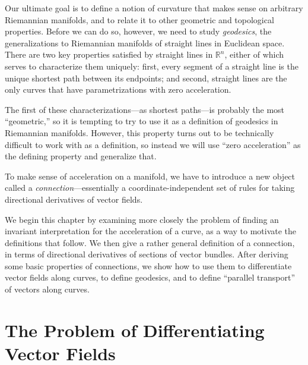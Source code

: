 
Our ultimate goal is to define a notion of curvature that makes sense on arbitrary Riemannian manifolds, and to relate it to other geometric and topological properties. Before we can do so, however, we need to study \emph{geodesics}, the generalizations to Riemannian manifolds of straight lines in Euclidean space. There are two key properties satisfied by straight lines in $\mathbb{R}^n$, either of which serves to characterize them uniquely: first, every segment of a straight line is the unique shortest path between its endpoints; and second, straight lines are the only curves that have parametrizations with zero acceleration.

The first of these characterizations---as shortest paths---is probably the most ``geometric,'' so it is tempting to try to use it as a definition of geodesics in Riemannian manifolds. However, this property turns out to be technically difficult to work with as a definition, so instead we will use ``zero acceleration'' as the defining property and generalize that.

To make sense of acceleration on a manifold, we have to introduce a new object called a \emph{connection}---essentially a coordinate-independent set of rules for taking directional derivatives of vector fields.

We begin this chapter by examining more closely the problem of finding an invariant interpretation for the acceleration of a curve, as a way to motivate the definitions that follow. We then give a rather general definition of a connection, in terms of directional derivatives of sections of vector bundles. After deriving some basic properties of connections, we show how to use them to differentiate vector fields along curves, to define geodesics, and to define ``parallel transport'' of vectors along curves.

\section{The Problem of Differentiating Vector Fields}

